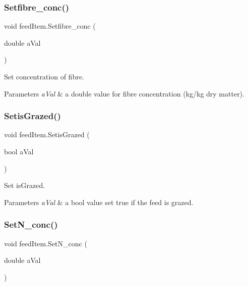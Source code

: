 \subsubsection{\texorpdfstring{Setfibre\_conc()}{Setfibre\_conc()}}
{\footnotesize\ttfamily void feed\+Item.\+Setfibre\+\_\+conc (\begin{DoxyParamCaption}\item[{double}]{a\+Val }\end{DoxyParamCaption})\hspace{0.3cm}{\ttfamily [inline]}}



Set concentration of fibre. 


\begin{DoxyParams}{Parameters}
{\em a\+Val} & a double value for fibre concentration (kg/kg dry matter). \\
\hline
\end{DoxyParams}
\mbox{\label{classfeed_item_aaaed481d4af8ab0cb4a06983efcaa08c}} 
\subsubsection{\texorpdfstring{SetisGrazed()}{SetisGrazed()}}
{\footnotesize\ttfamily void feed\+Item.\+Setis\+Grazed (\begin{DoxyParamCaption}\item[{bool}]{a\+Val }\end{DoxyParamCaption})\hspace{0.3cm}{\ttfamily [inline]}}



Set is\+Grazed. 


\begin{DoxyParams}{Parameters}
{\em a\+Val} & a bool value set true if the feed is grazed. \\
\hline
\end{DoxyParams}
\mbox{\label{classfeed_item_a86895df478a6843340ee4c75197b3ab0}} 
\subsubsection{\texorpdfstring{SetN\_conc()}{SetN\_conc()}}
{\footnotesize\ttfamily void feed\+Item.\+Set\+N\+\_\+conc (\begin{DoxyParamCaption}\item[{double}]{a\+Val }\end{DoxyParamCaption})\hspace{0.3cm}{\ttfamily [inline]}}



